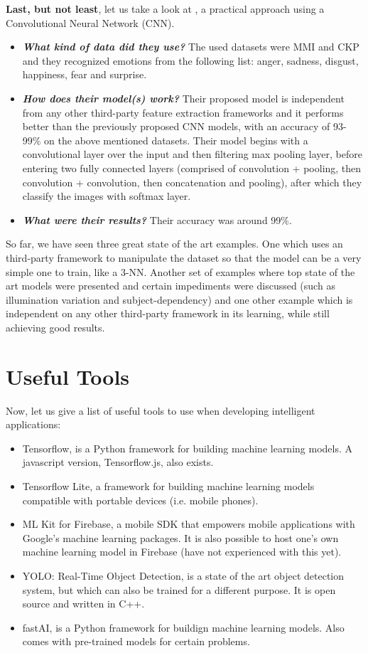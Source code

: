 \documentclass[runningheads,a4paper,11pt]{report}
\begin{document}
\textbf{Last, but not least}, let us take a look at \cite{Burkert16}, a practical approach using a Convolutional Neural Network (CNN).
\begin{itemize}
	\item \textbf{\emph{What kind of data did they use?}} The used datasets were MMI and CKP and they recognized emotions from the following list: anger, sadness, disgust, happiness, fear and surprise.
	\item \textbf{\emph{How does their model(s) work?}} Their proposed model is independent from any other third-party feature extraction frameworks and it performs better than the previously proposed CNN models, with an accuracy of 93-99\% on the above mentioned datasets. Their model begins with a convolutional layer over the input and then filtering max pooling layer, before entering two fully connected layers (comprised of convolution + pooling, then convolution + convolution, then concatenation and pooling), after which they classify the images with softmax layer.
	\item \textbf{\emph{What were their results?}} Their accuracy was around 99\%.
\end{itemize}


So far, we have seen three great state of the art examples. One which uses an third-party framework to manipulate the dataset so that the model can be a very simple one to train, like a 3-NN. Another set of examples where top state of the art models were presented and certain impediments were discussed (such as illumination variation and subject-dependency) and one other example which is independent on any other third-party framework in its learning, while still achieving good results.


\section{Useful Tools}
\label{section:ut}


Now, let us give a list of useful tools to use when developing intelligent applications:
\begin{itemize}
	\item Tensorflow, is a Python framework for building machine learning models. A javascript version, Tensorflow.js, also exists.
	\item Tensorflow Lite, a framework for building machine learning models compatible with portable devices (i.e. mobile phones).
	\item ML Kit for Firebase, a mobile SDK that empowers mobile applications with Google's machine learning packages. It is also possible to host one's own machine learning model in Firebase (have not experienced with this yet).
	\item YOLO: Real-Time Object Detection, is a state of the art object detection system, but which can also be trained for a different purpose. It is open source and written in C++.
	\item fastAI, is a Python framework for buildign machine learning models. Also comes with pre-trained models for certain problems.
\end{itemize}
\end{document}
